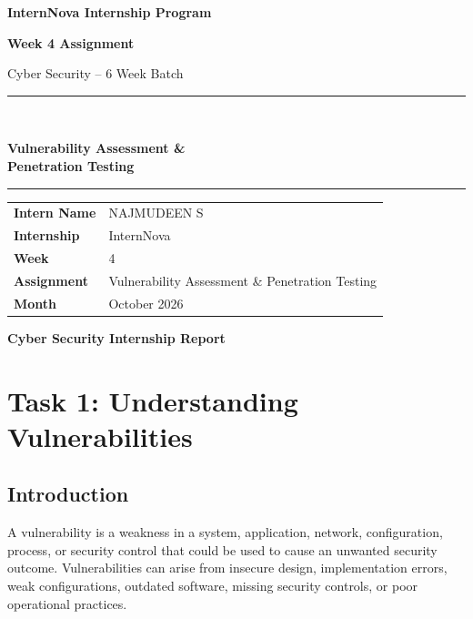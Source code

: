 \documentclass[11pt,a4paper]{article}
\begin{document}
\begin{titlepage}
\thispagestyle{empty}
\centering
\vspace*{1.15cm}
{\Huge\bfseries InternNova Internship Program\par}
\vspace{0.35cm}
{\Large\bfseries Week 4 Assignment\par}
\vspace{0.35cm}
{\Large Cyber Security – 6 Week Batch\par}
\vspace{1.2cm}

\rule{0.82\textwidth}{0.7pt}\\[0.35cm]
{\LARGE\bfseries Vulnerability Assessment \&\\[0.15cm] Penetration Testing\par}
\vspace{0.35cm}
\rule{0.82\textwidth}{0.7pt}

\vfill
\begin{tabular}{>{\bfseries}p{4.2cm}p{6.5cm}}
Intern Name & NAJMUDEEN S\\
Internship & InternNova\\
Week & 4\\
Assignment & Vulnerability Assessment \& Penetration Testing\\
Month & October 2026\\
\end{tabular}
\vfill

{\large\bfseries Cyber Security Internship Report\par}
\end{titlepage}

\setcounter{page}{2}
\tableofcontents
\newpage

\setcounter{page}{1}

\section{Task 1: Understanding Vulnerabilities}

\subsection{Introduction}
A vulnerability is a weakness in a system, application, network, configuration, process, or security control that could be used to cause an unwanted security outcome. Vulnerabilities can arise from insecure design, implementation errors, weak configurations, outdated software, missing security controls, or poor operational practices.
\end{document}
